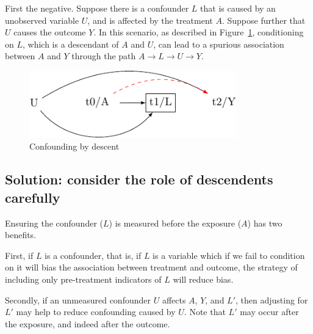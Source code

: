 \documentclass[
  singlecolumn]{report}
\begin{document}
First the negative. Suppose there is a confounder \(L\) that is caused
by an unobserved variable \(U\), and is affected by the treatment \(A\).
Suppose further that \(U\) causes the outcome \(Y\). In this scenario,
as described in Figure~\ref{fig-dag-descendent}, conditioning on \(L\),
which is a descendant of \(A\) and \(U\), can lead to a spurious
association between \(A\) and \(Y\) through the path
\(A \to L \to U \to Y\).

\begin{figure}

{\centering \includegraphics[width=0.8\textwidth,height=\textheight]{causal-dags_files/figure-pdf/fig-dag-descendent-1.pdf}

}

\caption{\label{fig-dag-descendent}Confounding by descent}

\end{figure}

\hypertarget{solution-consider-the-role-of-descendents-carefully}{%
\subsection{Solution: consider the role of descendents
carefully}\label{solution-consider-the-role-of-descendents-carefully}}

Ensuring the confounder (\(L\)) is measured before the exposure (\(A\))
has two benefits.

First, if \(L\) is a confounder, that is, if \(L\) is a variable which
if we fail to condition on it will bias the association between
treatment and outcome, the strategy of including only pre-treatment
indicators of \(L\) will reduce bias.

Secondly, if an unmeasured confounder \(U\) affects \(A\), \(Y\), and
\(L\prime\), then adjusting for \(L\prime\) may help to reduce
confounding caused by \(U\). Note that \(L\prime\) may occur after the
exposure, and indeed after the outcome.
\end{document}
